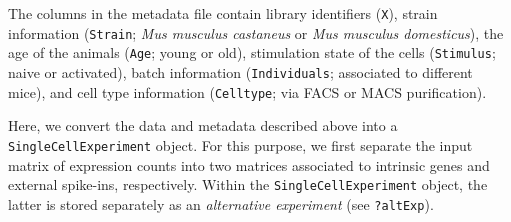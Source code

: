 \documentclass[9pt,a4paper,]{extarticle}
\newenvironment{Shaded}{\begin{snugshade}}{\end{snugshade}}
\newcommand{\CharTok}[1]{\textcolor[rgb]{0.31,0.60,0.02}{#1}}
\newcommand{\CommentTok}[1]{\textcolor[rgb]{0.56,0.35,0.01}{\textit{#1}}}
\newcommand{\ControlFlowTok}[1]{\textcolor[rgb]{0.13,0.29,0.53}{\textbf{#1}}}
\newcommand{\DataTypeTok}[1]{\textcolor[rgb]{0.13,0.29,0.53}{#1}}
\newcommand{\KeywordTok}[1]{\textcolor[rgb]{0.13,0.29,0.53}{\textbf{#1}}}
\newcommand{\NormalTok}[1]{#1}
\newcommand{\OperatorTok}[1]{\textcolor[rgb]{0.81,0.36,0.00}{\textbf{#1}}}
\newcommand{\OtherTok}[1]{\textcolor[rgb]{0.56,0.35,0.01}{#1}}
\newcommand{\StringTok}[1]{\textcolor[rgb]{0.31,0.60,0.02}{#1}}
\begin{document}
\begin{Shaded}
\end{Shaded}

The columns in the metadata file contain library identifiers (\texttt{X}), strain
information (\texttt{Strain}; \emph{Mus musculus castaneus} or \emph{Mus musculus domesticus}),
the age of the animals (\texttt{Age}; young or old), stimulation state of the cells
(\texttt{Stimulus}; naive or activated), batch information (\texttt{Individuals}; associated
to different mice), and cell type information (\texttt{Celltype}; via FACS or MACS
purification).

Here, we convert the data and metadata described above into a
\texttt{SingleCellExperiment} object.
For this purpose, we first separate the input matrix of expression counts into
two matrices associated to intrinsic genes and external spike-ins, respectively.
Within the \texttt{SingleCellExperiment} object, the latter is stored separately
as an \emph{alternative experiment} (see \texttt{?altExp}).
\end{document}
